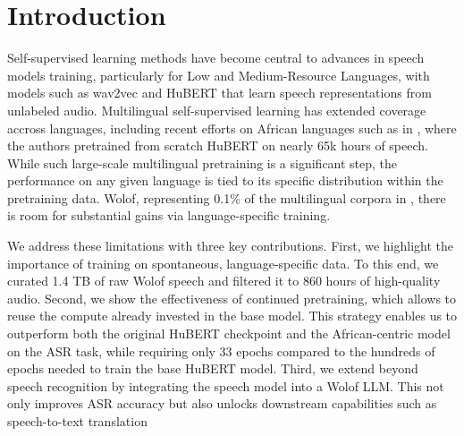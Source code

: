 \documentclass{article}
\begin{document}
\section{Introduction}
\label{sec:intro}

Self-supervised learning methods have become central to advances in speech models training, particularly for Low and Medium-Resource Languages, with models such as wav2vec \cite{wav2vec2} and HuBERT \cite{hubert} that learn speech representations from unlabeled audio.  Multilingual self-supervised learning has extended coverage accross languages, including recent efforts on African languages such as in \cite{gauthierSSL}, where the authors pretrained from scratch HuBERT on nearly 65k hours of speech. While such large-scale multilingual pretraining is a significant step, the performance on any given language is tied to its specific distribution within the pretraining data. Wolof, representing 0.1\% of the multilingual corpora in \cite{gauthierSSL}, there is room for substantial gains via language-specific training.

We address these limitations with three key contributions. First, we highlight the importance of training on spontaneous, language-specific data. To this end, we curated 1.4 TB of raw Wolof speech and filtered it to 860 hours of high-quality audio. Second, we show the effectiveness of continued pretraining, which allows to reuse the compute already invested in the base model. This strategy enables us to outperform both the original HuBERT checkpoint and the African-centric model on the ASR task, while requiring only 33 epochs compared to the hundreds of epochs needed to train the base HuBERT model. Third, we extend beyond speech recognition by integrating the speech model into a Wolof LLM. This not only improves ASR accuracy but also unlocks downstream capabilities such as speech-to-text translation
\end{document}
